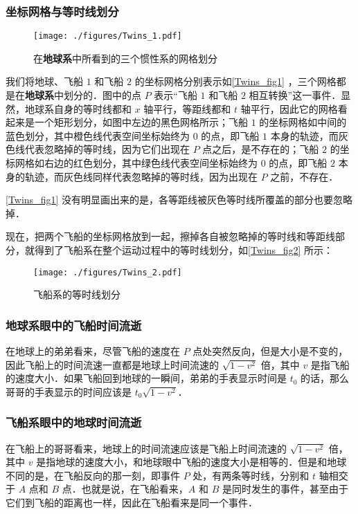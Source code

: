 \subsubsection{坐标网格与等时线划分}

\begin{figure}[ht]
\centering
\texttt{[image: ./figures/Twins\_1.pdf]}
\caption{在\textbf{地球系}中所看到的三个惯性系的网格划分} \label{Twins_fig1}
\end{figure}

我们将地球、飞船 $1$ 和飞船 $2$ 的坐标网格分别表示如\autoref{Twins_fig1} ，三个网格都是在\textbf{地球系}中划分的．图中的点 $P$ 表示“飞船 $1$ 和飞船 $2$ 相互转换”这一事件．显然，地球系自身的等时线都和 $x$ 轴平行，等距线都和 $t$ 轴平行，因此它的网格看起来是一个矩形划分，如图中左边的黑色网格所示；飞船 $1$ 的坐标网格如中间的蓝色划分，其中橙色线代表空间坐标始终为 $0$ 的点，即飞船 $1$ 本身的轨迹，而灰色线代表忽略掉的等时线，因为它们出现在 $P$ 点之后，是不存在的；飞船 $2$ 的坐标网格如右边的红色划分，其中绿色线代表空间坐标始终为 $0$ 的点，即飞船 $2$ 本身的轨迹，而灰色线同样代表忽略掉的等时线，因为出现在 $P$ 之前，不存在．

\autoref{Twins_fig1} 没有明显画出来的是，各等距线被灰色等时线所覆盖的部分也要忽略掉．

现在，把两个飞船的坐标网格放到一起，擦掉各自被忽略掉的等时线和等距线部分，就得到了飞船系在整个运动过程中的等时线划分，如\autoref{Twins_fig2} 所示：

\begin{figure}[ht]
\centering
\texttt{[image: ./figures/Twins\_2.pdf]}
\caption{飞船系的等时线划分} \label{Twins_fig2}
\end{figure}

\subsubsection{地球系眼中的飞船时间流逝}

在地球上的弟弟看来，尽管飞船的速度在 $P$ 点处突然反向，但是大小是不变的，因此飞船上的时间流速一直都是地球上时间流速的 $\sqrt{1-v^2}$ 倍，其中 $v$ 是指飞船的速度大小．如果飞船回到地球的一瞬间，弟弟的手表显示时间是 $t_0$ 的话，那么哥哥的手表显示的时间应该是 $t_0\sqrt{1-v^2}$．

\subsubsection{飞船系眼中的地球时间流逝}

在飞船上的哥哥看来，地球上的时间流速应该是飞船上时间流速的 $\sqrt{1-v^2}$ 倍，其中 $v$ 是指地球的速度大小，和地球眼中飞船的速度大小是相等的．但是和地球不同的是，在飞船反向的那一刻，即事件 $P$ 处，有两条等时线，分别和 $t$ 轴相交于 $A$ 点和 $B$ 点．也就是说，在飞船看来，$A$ 和 $B$ 是同时发生的事件，甚至由于它们到飞船的距离也一样，因此在飞船看来是同一个事件．

